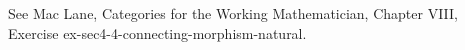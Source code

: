 See Mac Lane, Categories for the Working Mathematician, Chapter VIII, Exercise ex-sec4-4-connecting-morphism-natural.
